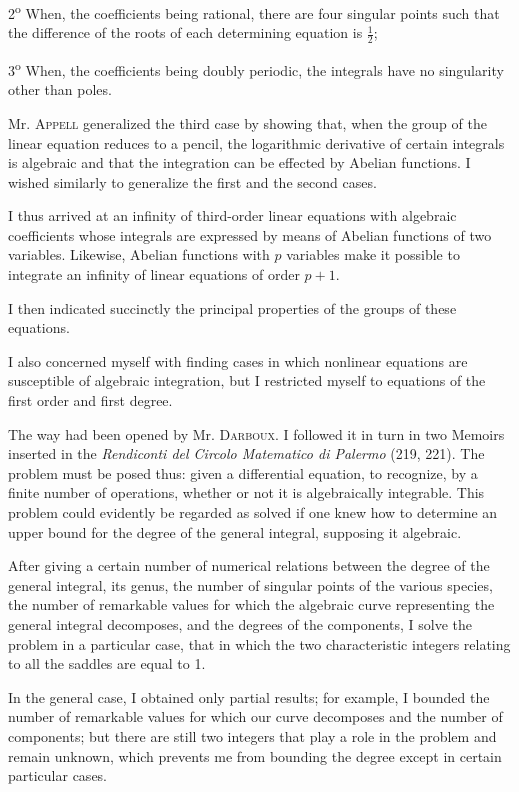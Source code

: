 \documentclass[11pt]{article}
\begin{document}
2\textsuperscript{o} When, the coefficients being rational, there are four singular points such that the difference of the roots of each determining equation is $\frac12$;

3\textsuperscript{o} When, the coefficients being doubly periodic, the integrals have no singularity other than poles.

Mr. \textsc{Appell} generalized the third case by showing that, when the group of the linear equation reduces to a pencil, the logarithmic derivative of certain integrals is algebraic and that the integration can be effected by Abelian functions. I wished similarly to generalize the first and the second cases.

I thus arrived at an infinity of third-order linear equations with algebraic coefficients whose integrals are expressed by means of Abelian functions of two variables. Likewise, Abelian functions with $p$ variables make it possible to integrate an infinity of linear equations of order $p+1$.

I then indicated succinctly the principal properties of the groups of these equations.

I also concerned myself with finding cases in which nonlinear equations are susceptible of algebraic integration, but I restricted myself to equations of the first order and first degree.

The way had been opened by Mr. \textsc{Darboux}. I followed it in turn in two Memoirs inserted in the \emph{Rendiconti del Circolo Matematico di Palermo} (219, 221). The problem must be posed thus: given a differential equation, to recognize, by a finite number of operations, whether or not it is algebraically integrable. This problem could evidently be regarded as solved if one knew how to determine an upper bound for the degree of the general integral, supposing it algebraic.

After giving a certain number of numerical relations between the degree of the general integral, its genus, the number of singular points of the various species, the number of remarkable values for which the algebraic curve representing the general integral decomposes, and the degrees of the components, I solve the problem in a particular case, that in which the two characteristic integers relating to all the saddles are equal to 1.

In the general case, I obtained only partial results; for example, I bounded the number of remarkable values for which our curve decomposes and the number of components; but there are still two integers that play a role in the problem and remain unknown, which prevents me from bounding the degree except in certain particular cases.
\end{document}
